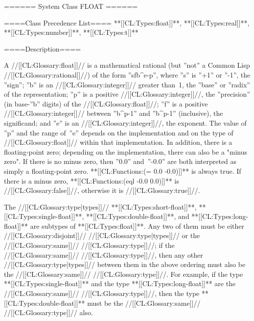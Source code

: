 ====== System Class FLOAT ======

====Class Precedence List==== **[[CL:Types:float]]**, **[[CL:Types:real]]**, **[[CL:Types:number]]**, **[[CL:Types:t]]**

====Description====

A //[[CL:Glossary:float]]// is a mathematical rational (but ''not'' a Common Lisp //[[CL:Glossary:rational]]//) of the form ''s\cdot f\cdot b^{e-p}'', where ''s'' is ''+1'' or ''-1'', the ''sign''; ''b'' is an //[[CL:Glossary:integer]]// greater than~1, the ''base'' or ''radix'' of the representation; ''p'' is a positive //[[CL:Glossary:integer]]//, the ''precision'' (in base-''b'' digits) of the //[[CL:Glossary:float]]//; ''f'' is a positive //[[CL:Glossary:integer]]// between ''b^{p-1}'' and ''b^p-1'' (inclusive), the significand; and ''e'' is an //[[CL:Glossary:integer]]//, the exponent. The value of ''p'' and the range of~''e'' depends on the implementation and on the type of //[[CL:Glossary:float]]// within that implementation. In addition, there is a floating-point zero; depending on the implementation, there can also be a "minus zero". If there is no minus zero, then ''0.0'' and~''-0.0'' are both interpreted as simply a floating-point zero. **[[CL:Functions:(= 0.0 -0.0)]]** is always true. If there is a minus zero, **[[CL:Functions:(eql -0.0 0.0)]]** is //[[CL:Glossary:false]]//, otherwise it is //[[CL:Glossary:true]]//.



The //[[CL:Glossary:type|types]]// **[[CL:Types:short-float]]**, **[[CL:Types:single-float]]**, **[[CL:Types:double-float]]**, and **[[CL:Types:long-float]]** are subtypes of **[[CL:Types:float]]**. Any two of them must be either //[[CL:Glossary:disjoint]]// //[[CL:Glossary:type|types]]// or the //[[CL:Glossary:same]]// //[[CL:Glossary:type]]//; if the //[[CL:Glossary:same]]// //[[CL:Glossary:type]]//, then any other //[[CL:Glossary:type|types]]// between them in the above ordering must also be the //[[CL:Glossary:same]]// //[[CL:Glossary:type]]//. For example, if the type **[[CL:Types:single-float]]** and the type **[[CL:Types:long-float]]** are the //[[CL:Glossary:same]]// //[[CL:Glossary:type]]//, then the type **[[CL:Types:double-float]]** must be the //[[CL:Glossary:same]]// //[[CL:Glossary:type]]// also.

